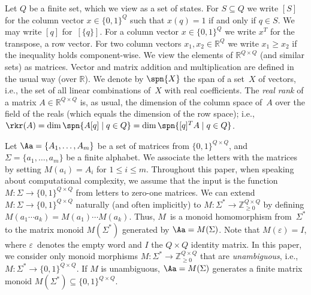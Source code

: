 Let $Q$ be a finite set, which we view as a set of states.
For $S \subseteq Q$ we write $[S]$ for the column vector $x \in \{0,1\}^Q$ such that $x(q) = 1$ if and only if $q \in S$.
We may write $[q]$ for~$[\{q\}]$.
For a column vector $x \in \{0,1\}^Q$ we write $x^T$ for the transpose, a row vector.
For two column vectors $x_1,x_2 \in \mathbb{R}^Q$ we write $x_1 \ge x_2$ if the inequality holds component-wise.
We view the elements of $\mathbb{R}^{Q \times Q}$ (and similar sets) as matrices.
Vector and matrix addition and multiplication are defined in the usual way (over $\mathbb{R}$).
We denote by $\spn{X}$ the span of a set~$X$ of vectors, i.e., the set of all linear combinations of~$X$ with real coefficients.
The \emph{real rank} of a matrix $A \in \mathbb{R}^{Q \times Q}$ is, as usual, the dimension of the column space of~$A$ over the field of the reals (which equals the dimension of the row space); i.e., $\rkr(A) = \dim \spn{A [q] \mid q \in Q} = \dim \spn{[q]^T A \mid q \in Q}$.

Let $\Aa = \{A_1, \ldots, A_m\}$ be a set of matrices from $\{0,1\}^{Q \times Q}$, and $\Sigma = \{a_1, \ldots, a_m\}$ be a finite alphabet.
We associate the letters with the matrices by setting $M(a_i) = A_i$ for $1 \le i \le m$.
Throughout this paper, when speaking about computational complexity, we assume that the input is the function $M \colon \Sigma \to \{0,1\}^{Q \times Q}$ from letters to zero-one matrices.
We can extend  $M \colon \Sigma \to \{0,1\}^{Q \times Q}$ naturally (and often implicitly) to $M \colon \Sigma^* \to \mathbb{Z}_{\ge 0}^{Q \times Q}$ by defining $M(a_1 \cdots a_k) = M(a_1) \cdots M(a_k)$. %
Thus, $M$~is a monoid homomorphism from~$\Sigma^*$ to the matrix monoid $M(\Sigma^*)$ generated by $\Aa = M(\Sigma)$.
Note that $M(\varepsilon) = I$, where $\varepsilon$~denotes the empty word and $I$ the $Q \times Q$ identity matrix. In this paper, we consider only monoid morphisms $M \colon \Sigma^* \to \mathbb{Z}_{\ge 0}^{Q \times Q}$ that are \emph{unambiguous}, i.e., $M \colon \Sigma^* \to \{0,1\}^{Q \times Q}$. If $M$ is unambiguous, $\Aa = M(\Sigma)$ generates a finite matrix monoid $M(\Sigma^*) \subseteq \{0,1\}^{Q \times Q}$.

